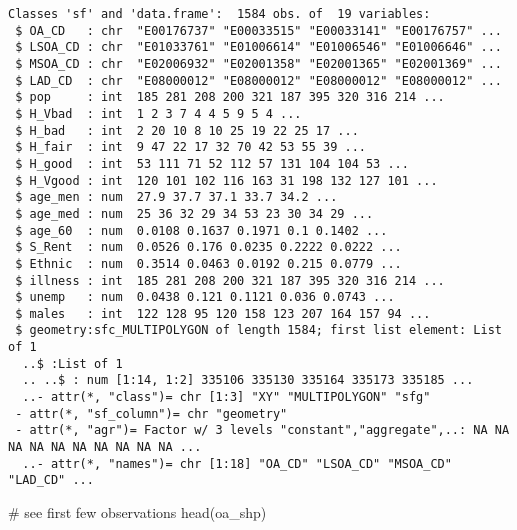 \documentclass[
  letterpaper,
  krantz2]{style/krantz}
\newenvironment{Shaded}{\begin{snugshade}}{\end{snugshade}}
\newcommand{\CommentTok}[1]{\textcolor[rgb]{0.37,0.37,0.37}{#1}}
\newcommand{\FunctionTok}[1]{\textcolor[rgb]{0.28,0.35,0.67}{#1}}
\newcommand{\NormalTok}[1]{\textcolor[rgb]{0.00,0.23,0.31}{#1}}
\begin{document}
\begin{verbatim}
Classes 'sf' and 'data.frame':  1584 obs. of  19 variables:
 $ OA_CD   : chr  "E00176737" "E00033515" "E00033141" "E00176757" ...
 $ LSOA_CD : chr  "E01033761" "E01006614" "E01006546" "E01006646" ...
 $ MSOA_CD : chr  "E02006932" "E02001358" "E02001365" "E02001369" ...
 $ LAD_CD  : chr  "E08000012" "E08000012" "E08000012" "E08000012" ...
 $ pop     : int  185 281 208 200 321 187 395 320 316 214 ...
 $ H_Vbad  : int  1 2 3 7 4 4 5 9 5 4 ...
 $ H_bad   : int  2 20 10 8 10 25 19 22 25 17 ...
 $ H_fair  : int  9 47 22 17 32 70 42 53 55 39 ...
 $ H_good  : int  53 111 71 52 112 57 131 104 104 53 ...
 $ H_Vgood : int  120 101 102 116 163 31 198 132 127 101 ...
 $ age_men : num  27.9 37.7 37.1 33.7 34.2 ...
 $ age_med : num  25 36 32 29 34 53 23 30 34 29 ...
 $ age_60  : num  0.0108 0.1637 0.1971 0.1 0.1402 ...
 $ S_Rent  : num  0.0526 0.176 0.0235 0.2222 0.0222 ...
 $ Ethnic  : num  0.3514 0.0463 0.0192 0.215 0.0779 ...
 $ illness : int  185 281 208 200 321 187 395 320 316 214 ...
 $ unemp   : num  0.0438 0.121 0.1121 0.036 0.0743 ...
 $ males   : int  122 128 95 120 158 123 207 164 157 94 ...
 $ geometry:sfc_MULTIPOLYGON of length 1584; first list element: List of 1
  ..$ :List of 1
  .. ..$ : num [1:14, 1:2] 335106 335130 335164 335173 335185 ...
  ..- attr(*, "class")= chr [1:3] "XY" "MULTIPOLYGON" "sfg"
 - attr(*, "sf_column")= chr "geometry"
 - attr(*, "agr")= Factor w/ 3 levels "constant","aggregate",..: NA NA NA NA NA NA NA NA NA NA ...
  ..- attr(*, "names")= chr [1:18] "OA_CD" "LSOA_CD" "MSOA_CD" "LAD_CD" ...
\end{verbatim}

\begin{Shaded}
\begin{Highlighting}[]
\CommentTok{\# see first few observations}
\FunctionTok{head}\NormalTok{(oa\_shp)}
\end{Highlighting}
\end{Shaded}
\end{document}
